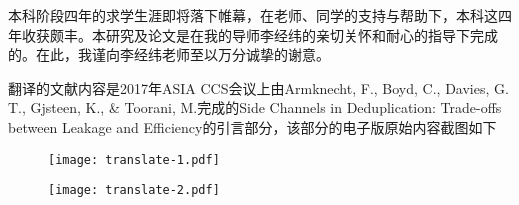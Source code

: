 \documentclass[bachelor]{thesis-uestc}
\begin{document}
\thesistableofcontents

\thesischapterexordium













\thesisacknowledgement

本科阶段四年的求学生涯即将落下帷幕，在老师、同学的支持与帮助下，本科这四年收获颇丰。本研究及论文是在我的导师李经纬的亲切关怀和耐心的指导下完成的。在此，我谨向李经纬老师至以万分诚挚的谢意。

\nocite{*}



\thesisappendix

\thesistranslationoriginal

翻译的文献内容是2017年ASIA CCS会议上由Armknecht, F., Boyd, C., Davies, G. T., Gjsteen, K., \& Toorani, M.完成的Side Channels in Deduplication: Trade-offs between Leakage and Efficiency的引言部分，该部分的电子版原始内容截图如下

\begin{figure}[!htb]
    \small
    \centering
    \texttt{[image: translate-1.pdf]} 
    \label{fig:}
\end{figure}
\begin{figure}[!htb]
    \small
    \centering
    \texttt{[image: translate-2.pdf]} 
    \label{fig:}
\end{figure}
%
%
\thesistranslationchinese
%

\end{document}
